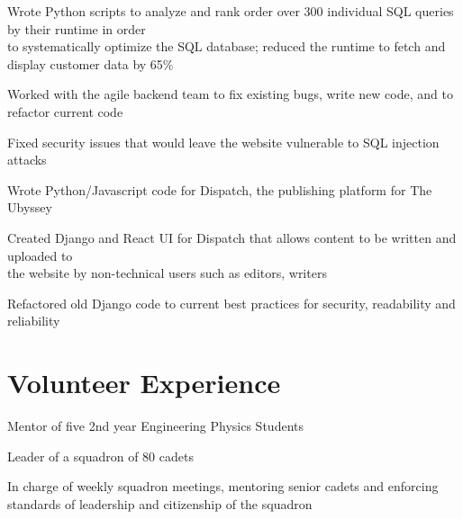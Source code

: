 \documentclass[]{deedy-resume-openfont}
\begin{document}
	\begin{tightemize}
		\item Wrote Python scripts to analyze and rank order over 300 individual SQL queries by their runtime in order \\ to systematically optimize the SQL database; reduced the runtime to fetch and display customer data by 65\%
		\item Worked with the agile backend team to fix existing bugs, write new code, and to refactor current code
		\item Fixed security issues that would leave the website vulnerable to SQL injection attacks
	\end{tightemize}
	\vspace{8pt}
	
	\begin{tightemize}
		\item Wrote Python/Javascript code for Dispatch, the publishing platform for The Ubyssey
		\item Created Django and React UI for Dispatch that allows content to be written and uploaded to \\ the website by non-technical users such as editors, writers
		\item Refactored old Django code to current best practices for security, readability and reliability
	\end{tightemize}
	\vspace{10pt}
	
	\section{Volunteer Experience}
	\begin{tightemize}
		\item Mentor of five 2nd year Engineering Physics Students
	\end{tightemize}
	\vspace{8pt}
	
	\begin{tightemize}
		\item Leader of a squadron of 80 cadets
		\item In charge of weekly squadron meetings, mentoring senior cadets and enforcing standards of leadership and citizenship of the squadron
	\end{tightemize}
	\vspace{10pt}
	
\end{document}
